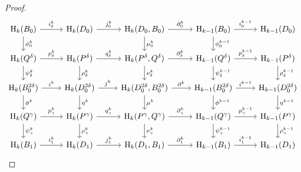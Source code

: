 \begin{proof}
\begin{equation}\begin{tikzcd}
    \hom_k(B_0)\arrow{r}{i^k_0}\arrow{d}{\phi^k_0} &
    \hom_k(D_0)\arrow{r}{j^k_0} & %
    \hom_k(D_0, B_0)\arrow{r}{\partial^k_0}\arrow{d}{\mu^k_0} &
    \hom_{k-1}(B_0)\arrow{r}{i^{k-1}_0}\arrow{d}{\phi^{k-1}_0} &
    \hom_{k-1}(D_0) \\%
    \hom_k(Q^\delta)\arrow{r}{p^k_\delta} \arrow{d}{\psi^k_\delta} &
    \hom_k(P^\delta)\arrow{r}{q^k_\delta} \arrow{d}{\rho^k_\delta} &
    \hom_k(P^\delta, Q^\delta)\arrow{r}{\partial^k_\delta} \arrow{d}{\nu^k_\delta} &
    \hom_{k-1}(Q^\delta)\arrow{r}{p^{k-1}_\delta} \arrow{d}{\psi^{k-1}_\delta} &
    \hom_{k-1}(P^\delta)\arrow{d}{\rho^{k-1}_\delta}\\
    \hom_k(B_0^{2\delta})\arrow{r}{i^k}\arrow{d}{\phi^k} &
    \hom_k(D_0^{2\delta})\arrow{r}{j^k}\arrow{d}{\eta^k} &
    \hom_k(D_0^{2\delta}, B_0^{2\delta})\arrow{r}{\partial^k}\arrow{d}{\mu^k} &
    \hom_{k-1}(B_0^{2\delta})\arrow{r}{i^{k-1}}\arrow{d}{\phi^{k-1}} &
    \hom_{k-1}(D_0^{2\delta})\arrow{d}{\eta^{k-1}}\\
    \hom_k(Q^\gamma)\arrow{r}{p^k_\gamma} \arrow{d}{\psi^k_\gamma} &
    \hom_k(P^\gamma)\arrow{r}{q^k_\gamma} \arrow{d}{\rho^k_\gamma} &
    \hom_k(P^\gamma, Q^\gamma)\arrow{r}{\partial^k_\gamma} \arrow{d}{\nu^k_\gamma} &
    \hom_{k-1}(Q^\gamma)\arrow{r}{p^{k-1}_\gamma} \arrow{d}{\psi^{k-1}_\gamma} &
    \hom_{k-1}(P^\gamma)\arrow{d}{\rho^{k-1}_\gamma}\\
    \hom_k(B_1)\arrow{r}{i^k_1} &
    \hom_k(D_1)\arrow{r}{j^k_1} &
    \hom_k(D_1, B_1)\arrow{r}{\partial^k_1} &
    \hom_{k-1}(B_1)\arrow{r}{i^{k-1}_1} &
    \hom_{k-1}(D_1)
\end{tikzcd}\end{equation}


\end{proof}
